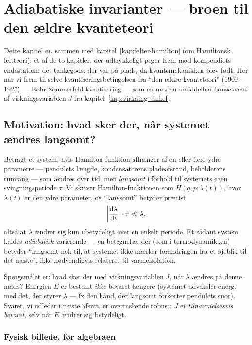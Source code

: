 
\chapter{Adiabatiske invarianter — broen til den ældre kvanteteori}
\label{kap:adiabatisk}

Dette kapitel er, sammen med kapitel~\ref{kap:felter-hamilton} (om
Hamiltonsk feltteori), et af de to kapitler, der udtrykkeligt peger
frem mod kompendiets endestation: det tankegods, der var på plads, da
kvantemekanikken blev født. Her når vi frem til selve
kvantiseringsbetingelsen fra ``den ældre kvanteteori'' (1900--1925) —
Bohr-Sommerfeld-kvantisering — som en næsten umiddelbar konsekvens af
virkningsvariablen $J$ fra kapitel~\ref{kap:virkning-vinkel}.

\section{Motivation: hvad sker der, når systemet ændres langsomt?}

Betragt et system, hvis Hamilton-funktion afhænger af en eller flere
ydre parametre — pendulets længde, kondensatorens pladeafstand,
beholderens rumfang — som ændres over tid, men \emph{langsomt} i
forhold til systemets egen svingningsperiode $\tau$. Vi skriver
Hamilton-funktionen som $H(q,p;\lambda(t))$, hvor $\lambda(t)$ er den
ydre parameter, og ``langsomt'' betyder præcist
\begin{equation}
  \left|\dv{\lambda}{t}\right|\cdot\tau \ll \lambda,
\end{equation}
altså at $\lambda$ ændrer sig kun ubetydeligt over en enkelt periode.
Et sådant system kaldes \emph{adiabatisk} varierende — en betegnelse,
der (som i termodynamikken) betyder ``langsomt nok til, at systemet
ikke mærker forandringen fra et øjeblik til det næste'', ikke
nødvendigvis relateret til varmeisolation.

Spørgsmålet er: hvad sker der med virkningsvariablen $J$, når
$\lambda$ ændres på denne måde? Energien $E$ er bestemt \emph{ikke}
bevaret længere (systemet udveksler energi med det, der styrer
$\lambda$ — fx den hånd, der langsomt forkorter pendulets snor).
Svaret, vi udleder i næste afsnit, er overraskende robust: $J$ er
\emph{tilnærmelsesvis bevaret}, selv når $E$ ændrer sig betydeligt.

\subsection{Fysisk billede, før algebraen}

